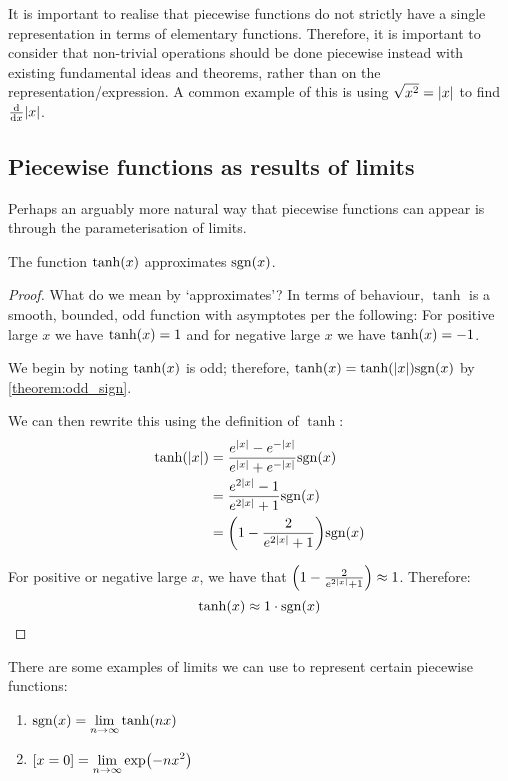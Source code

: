 It is important to realise that piecewise functions do not strictly have a single representation in terms of elementary functions. Therefore, it is important to consider that non-trivial operations should be done piecewise instead with existing fundamental ideas and theorems, rather than on the representation/expression. A common example of this is using $\sqrt{x^2}=\abs{x}$ to find $\dv{}{x}{\abs{x}}$.

\subsection{Piecewise functions as results of limits}
Perhaps an arguably more natural way that piecewise functions can appear is through the parameterisation of limits.

\begin{example}
    \label{example:sign_approx}
    The function $\tanh\paren{x}$ approximates $\sgn{x}$.

    \begin{proof}
        What do we mean by `approximates'? In terms of behaviour, $\tanh$ is a smooth, bounded, odd function with asymptotes per the following: For positive large $x$ we have $\tanh\paren{x}=1$ and for negative large $x$ we have $\tanh\paren{x}=-1$.

        We begin by noting $\tanh\paren{x}$ is odd; therefore, $\tanh\paren{x}=\tanh\paren{\abs{x}}\sgn{x}$ by \ref{theorem:odd_sign}.

        We can then rewrite this using the definition of $\tanh$:
        \begin{align*}
            \tanh\paren{\abs{x}} &= \frac{e^{\abs{x}}-e^{-\abs{x}}}{e^{\abs{x}}+e^{-\abs{x}}}\sgn{x} \\
                           &= \frac{e^{2\abs{x}}-1}{e^{2\abs{x}}+1}\sgn{x} \\
                           &= \paren*{1-\frac{2}{e^{2\abs{x}}+1}}\sgn{x}
        \end{align*}

        For positive or negative large $x$, we have that $\paren*{1-\frac{2}{e^{2\abs{x}}+1}}\approx 1$. Therefore:
        $$
            \tanh\paren{x} \approx 1\cdot\sgn{x}
        $$
    \end{proof}
\end{example}

\begin{theorem}
    There are some examples of limits we can use to represent certain piecewise functions:
    \begin{enumerate}
        \item $\sgn{x}=\displaystyle\lim_{n\to\infty}{\tanh\paren*{nx}}$
        \item $[x=0]=\displaystyle\lim_{n\to\infty}{\exp\paren*{-nx^2}}$
    \end{enumerate}
\end{theorem}

